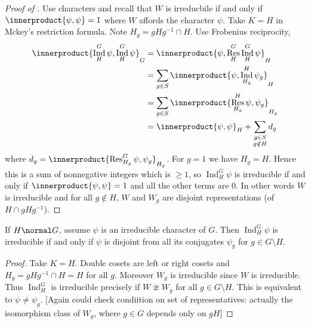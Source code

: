 \documentclass[a4paper]{article}
\newcommand*{\ip}{\innerproduct} %
\DeclareMathOperator{\Res}{Res} %
\DeclareMathOperator{\Ind}{Ind} %
\theoremstyle{definition}
\begin{document}
\begin{proof}[Proof of ]
  Use characters and recall that \(W\) is irreducbile if and only if \(\ip{\psi, \psi} = 1\) where \(W\) affords the character \(\psi\). Take \(K = H\) in Mckey's restriction formula. Note \(H_g = gHg^{-1} \cap H\). Use Frobenius reciprocity,
  \begin{align*}
    \ip{\Ind_H^G \psi, \Ind_H^G \psi}_G
    &= \ip{\psi, \Res_H^G \Ind_H^G \psi}_H \\
    &= \sum_{g \in S} \ip{\psi, \Ind_{H_g}^H \psi_g}_H \\
    &= \sum_{g \in S} \ip{\Res_{H_g}^H \psi, \psi_g}_{H_g} \\
    &= \ip{\psi, \psi}_H + \sum_{\substack{g \in S \\ g \notin H}} d_g
  \end{align*}
  where \(d_g = \ip{\Res_{H_g}^G \psi, \psi_g}_{H_g}\). For \(g = 1\) we have \(H_g = H\). Hence this is a sum of nonnegative integers which is \(\geq 1\), so \(\Ind_H^G \psi\) is irreducible if and only if \(\ip{\psi, \psi} = 1\) and all the other terms are \(0\). In other words \(W\) is irreducible and for all \(g \notin H\), \(W\) and \(W_g\) are disjoint representations (of \(H \cap gHg^{-1}\)).
\end{proof}

\begin{corollary}
  If \(H \normal G\), assume \(\psi\) is an irreducible character of \(G\). Then \(\Ind_H^G \psi\) is irreducible if and only if \(\psi\) is disjoint from all its conjugates \(\psi_g\) for \(g \in G \setminus H\).
\end{corollary}

\begin{proof}
  Take \(K = H\). Double cosets are left or right cosets and \(H_g = gHg^{-1} \cap H = H\) for all \(g\). Moreover \(W_g\) is irreducible since \(W\) is irreducible. Thus \(\Ind_H^G\) is irreducible precisely if \(W \ncong W_g\) for all \(g \in G \setminus H\). This is equivalent to \(\psi \neq \psi_g\). [Again could check condiition on set of representatives: actually the isomorphism class of \(W_g\), where \(g \in G\) depends only on \(gH\)]
\end{proof}
\end{document}
